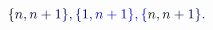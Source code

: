 \documentclass[12pt]{article}
\begin{document}
\makeatletter
\renewcommand*{\@textcolor}[3]{%
  \protect\leavevmode
  \begingroup
    \color#1{#2}#3%
  \endgroup
}
\makeatother
\begin{displaymath}
\mathcolor[RGB]{0,0,15}{\{} \mathcolor[RGB]{0,0,30}{n} \mathcolor[RGB]{0,0,45}{,} \mathcolor[RGB]{0,0,60}{n} \mathcolor[RGB]{0,0,75}{+} \mathcolor[RGB]{0,0,90}{1} \mathcolor[RGB]{0,0,105}{\}} \mathcolor[RGB]{0,0,120}{,} \mathcolor[RGB]{0,0,135}{\{} \mathcolor[RGB]{0,0,150}{1} \mathcolor[RGB]{0,0,165}{,} \mathcolor[RGB]{0,0,180}{n} \mathcolor[RGB]{0,0,195}{+} \mathcolor[RGB]{0,0,210}{1} \mathcolor[RGB]{0,0,225}{\}} \mathcolor[RGB]{0,0,240}{,} \mathcolor[RGB]{0,0,255}{\{} \mathcolor[RGB]{0,15,0}{n} \mathcolor[RGB]{0,15,15}{,} \mathcolor[RGB]{0,15,30}{n} \mathcolor[RGB]{0,15,45}{+} \mathcolor[RGB]{0,15,60}{1} \mathcolor[RGB]{0,15,75}{\}} \mathcolor[RGB]{0,15,90}{.}
\end{displaymath}
\end{document}

